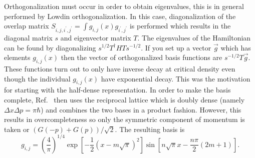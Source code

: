    Orthogonalization must occur in order to obtain eigenvalues, this is in general performed by Lowdin orthogonalization.  In this case, diagonalization of the overlap matrix $S_{i,j,i^{\prime},j^{\prime}}=\int g_{i,j}\left(x\right)g_{i^{\prime},j^{\prime}}$ is performed which results in the diagonal matrix $s$ and eigenvector matrix $T$.  The eigenvalues of the Hamiltonian can be found by diagonalizing $s^{1/2}T^{\dagger}HTs^{-1/2}$.  If you set up a vector $\vec{g}$ which has elements $g_{i,j}\left(x\right)$ then the vector of orthogonalized basis functions are $s^{-1/2}T\vec{g}$.  These functions turn out to only have inverse decay at critical density even though the individual $g_{i,j}\left(x\right)$ have exponential decay.  This was the motivation for starting with the half-dense representation.  In order to make the basis complete, Ref.~ then uses the reciprocal lattice which is doubly dense (namely $\Delta x\Delta p=\pi\hbar$) and combines the two bases in a product fashion.  However, this results in overcompleteness so only the symmetric component of momentum is taken or $\left(G\left(-p\right)+G\left(p\right)\right)/\sqrt{2}$.  The resulting basis is
 \begin{equation}\label{eq.psdd}
 g_{i,j}=\left(\dfrac{4}{\pi}\right)^{1/4}\exp\left[-\dfrac{1}{2}\left(x-m\sqrt{\pi}\right)^2\right]\sin\left[n\sqrt{\pi}x-\dfrac{n\pi}{2}\left(2m+1\right)\right].
 \end{equation} 
 
